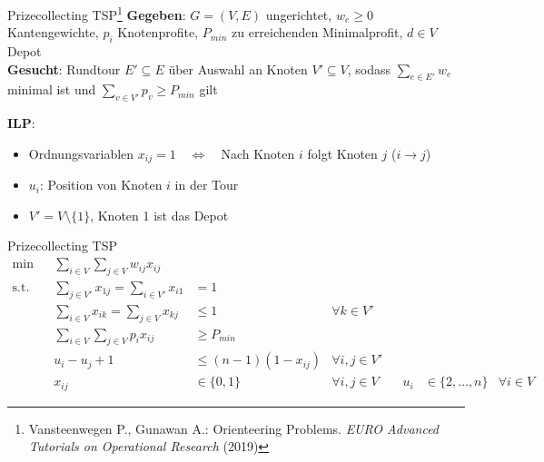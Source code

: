 \documentclass[ngerman,aspectratio=169,10pt]{beamer}
\begin{document}
\begin{frame}{Prizecollecting TSP\footnote{Vansteenwegen P., Gunawan A.: Orienteering Problems. \emph{EURO Advanced Tutorials on Operational Research} (2019)}}
	\textbf{Gegeben}: $G=(V,E)$ ungerichtet, $w_e\geq0$ Kantengewichte, $p_i$ Knotenprofite, $P_{min}$ zu erreichenden Minimalprofit, $d\in V$ Depot\\
	\textbf{Gesucht}: Rundtour $E'\subseteq E$ über Auswahl an Knoten $V'\subseteq V$, sodass $\sum_{e\in E'}w_e$ minimal ist und $\sum_{v\in V'}p_v\geq P_{min}$ gilt
	
	\textbf{ILP}:
	\begin{itemize}
		\item Ordnungsvariablen $x_{ij}=1\quad\Leftrightarrow\quad$Nach Knoten $i$ folgt Knoten $j$ ($i\rightarrow j$)
		\item $u_i$: Position von Knoten $i$ in der Tour
		\item $V'=V\setminus\{1\}$, Knoten 1 ist das Depot
	\end{itemize}
\end{frame}

\begin{frame}{Prizecollecting TSP}
	\begin{align*}
	\min && \sum_{i\in V}\sum_{j\in V}w_{ij}x_{ij}&&\\
	\text{s.t.} && \sum_{j\in V'}x_{1j}=\sum_{i\in V'}x_{i1}&=1&\\
	&& \sum_{i\in V}x_{ik} = \sum_{j\in V}x_{kj}&\leq1 &\forall k\in V'\\
	&& \sum_{i\in V}\sum_{j\in V}p_ix_{ij} &\geq P_{min} &\\
	&& u_i-u_j+1&\leq(n-1)(1-x_{ij})&\forall i,j\in V'\\
	&& x_{ij} &\in\{0,1\} &\forall i,j\in V	
	&& u_i &\in\{2,\ldots,n\} &\forall i\in V
	\end{align*}
	

\end{frame}
\end{document}
